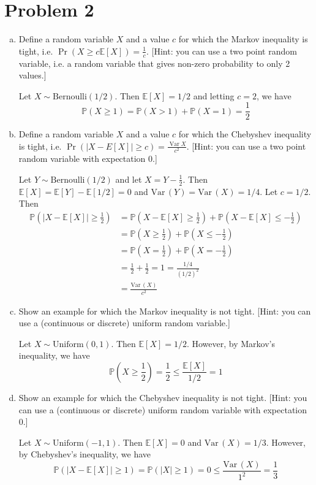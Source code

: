 \documentclass[12pt,letterpaper]{article}
\newcommand{\abs}[1]{\left\vert #1 \right\vert}
\renewcommand{\P}{\mathbb{P}}
\newcommand{\E}{\mathbb{E}}
\newcommand{\Var}{\text{Var}\,}
\begin{document}
\section*{Problem 2}
\begin{enumerate}[a.]
    \item Define a random variable $X$ and a value $c$ for which the Markov inequality is tight, i.e.
    $\Pr(X\geq c\mathbb{E}[X])=\frac{1}{c}$. [Hint: you can use a two point random variable, i.e. a random variable that gives non-zero probability to only 2 values.]


    \color{darkblue}
        Let $X \sim \text{Bernoulli}(1/2)$. Then $\E[X] = 1/2$ and letting $c = 2$, we have
        \[\P(X \geq 1) = \P(X > 1) + \P(X = 1) = \frac{1}{2}\]
    \color{black}

    \item Define a random variable $X$ and a value $c$ for which the Chebyshev inequality is tight, i.e.
    $\Pr(|X-E[X]|\geq c)=\frac{\operatorname{Var}{X}}{c^2}$. [Hint: you can use a two point random variable with expectation 0.]

    \color{darkblue}
        Let $Y \sim \text{Bernoulli}(1/2)$ and let $X = Y - \frac{1}{2}$. Then $\E[X] = \E[Y] - \E[1/2] = 0$ and $\Var(Y) = \Var(X) = 1/4$. Let $c = 1/2$. Then
        \begin{align*}
            \P(\abs{X - \E[X]} \geq \frac{1}{2}) &= \P(X - \E[X] \geq \frac{1}{2}) + \P(X - \E[X] \leq -\frac{1}{2})\\ 
            &= \P(X \geq \frac{1}{2}) + \P(X \leq -\frac{1}{2})\\
            &= \P(X = \frac{1}{2}) + \P(X = -\frac{1}{2})\\
            &= \frac{1}{2} + \frac{1}{2} = 1 = \frac{1/4}{(1/2)^2}\\ 
            &= \frac{\Var(X)}{c^2}
        \end{align*}
    \color{black}
        
    \item Show an example for which the Markov inequality is not tight. [Hint: you can use a (continuous or discrete) uniform random variable.]
    
    \color{darkblue}
        Let $X \sim \text{Uniform}(0,1)$. Then $\E[X] = 1/2$. However, by Markov's inequality, we have
        \[\P(X \geq \frac{1}{2}) = \frac{1}{2} \leq \frac{\E[X]}{1/2} = 1\]
    \color{black}

     \item Show an example for which the  Chebyshev inequality is not tight. [Hint: you can use a (continuous or discrete) uniform random variable with expectation 0.]
     
     \color{darkblue}
        Let $X \sim \text{Uniform}(-1,1)$. Then $\E[X] = 0$ and $\Var(X) = 1/3$. However, by Chebyshev's inequality, we have
        \[\P(\abs{X - \E[X]} \geq 1) = \P(\abs{X} \geq 1) = 0 \leq \frac{\Var(X)}{1^2} = \frac{1}{3}\]
     \color{black}

   
\end{enumerate}
\end{document}
